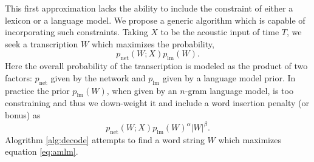 This first approximation lacks the ability to include the constraint of either
a lexicon or a language model. We propose a generic algorithm which is capable
of incorporating such constraints. Taking $X$ to be the acoustic input of time
$T$, we seek a transcription $W$ which maximizes the probability,
\begin{equation}
  \label{eq:joint} p_{\text{net}}(W ; X) p_{\text{lm}}(W).  
\end{equation} 
Here the overall probability of the transcription is modeled as the product of
two factors: $p_{\text{net}}$ given by the network and $p_{\text{lm}}$ given by
a language model prior. In practice the prior $p_{\text{lm}}(W)$, when given by
an $n$-gram language model, is too constraining and thus we down-weight it and
include a word insertion penalty (or bonus) as
\begin{equation}\label{eq:amlm}
    p_{\text{net}}(W ; X) p_{\text{lm}}(W)^\alpha |W|^\beta.
\end{equation}
Alogrithm \ref{alg:decode} attempts to find a word string $W$ which maximizes
equation \ref{eq:amlm}.
